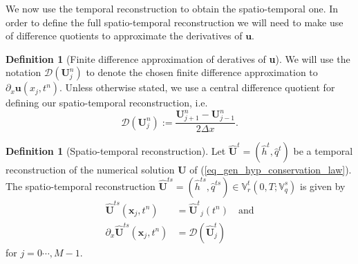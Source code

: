 \documentclass[12pt,a4paper]{article}
\numberwithin{equation}{section}
\theoremstyle{definition}
\newcommand{\FD}{\mathcal{D}}
\newcommand{\vect}[1]{\textbf{#1}}
\newcommand{\qp}[1]{\left(#1\right)}
\newcommand{\rec}[1]{\widehat{{#1}}}
\newtheorem{Defn}[subsection]{Definition}
\begin{document}
We now use the temporal reconstruction to obtain the spatio-temporal one.  In order to define the full spatio-temporal reconstruction we will need to make use of difference quotients to approximate the derivatives of $\vect{u}$.  
\begin{Defn}[Finite difference approximation of deratives of \vect{u}]
We will use the notation 
$\FD\qp{\vect{U}^n_j}$
to denote the chosen finite difference approximation to $\partial_x\vect{u}\qp{x_j,t^n}$. Unless otherwise stated, we use a central difference quotient for defining our spatio-temporal reconstruction, i.e.
\begin{equation}
\FD\qp{\vect{U}^n_j}:=\frac{\vect{U}^{n}_{j+1}-\vect{U}^{n}_{j-1}}{2\Delta x}.
\end{equation}
\end{Defn}
\begin{Defn}[Spatio-temporal reconstruction]\label{defn_spatio-temporal reconstruction}
	Let $ \widehat{\textbf{U}}^t=\qp{\rec{h}^t,\rec{q}^t}$ be a temporal reconstruction of the numerical solution $\vect{U}$ of (\ref{eq_gen_hyp_conservation_law}).  The spatio-temporal reconstruction $\widehat{\textbf{U}}^{ts}=\qp{\rec{h}^{ts},\rec{q}^{ts}}\in\mathbb{V}^t_r\qp{0,T; \mathbb{V}^s_q}$ is given by
	\begin{equation}\label{eq_conds_spatiotemp}
	\begin{aligned}
	 \widehat{\vect {U}}^{ts}\qp{\vect x_j,t^n}&= 
	{ \widehat{\vect {U}}^t}_j\qp{t^n}\quad \text{and}\\
	\partial_{x}{ \widehat{\vect {U}}^{ts}\qp{\vect x_j,t^n}}&= 
	\FD{\qp{ \widehat{\vect {U}}^t_j  }}
	\end{aligned}
	\end{equation}
	for $  j=0\cdots,M-1$.  
\end{Defn}
\end{document}
